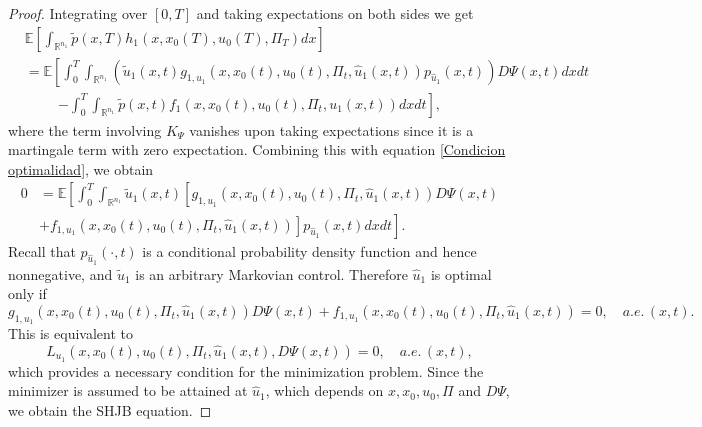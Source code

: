 \documentclass[10pt,a4paper]{amsart}
\begin{document}
\begin{proof}
Integrating over $[0,T]$ and taking expectations on both sides we get
    \begin{align*}
        & \mathbb{E}\left[\int_{\mathbb{R}^{n_1}}\tilde{p}(x,T)h_1(x,x_0(T),u_0(T),\Pi_T)dx\right] \\
        &=\mathbb{E}\left[\int_0^T\int_{\mathbb{R}^{n_1}}\left( \tilde{u}_1(x,t)g_{1,u_1}(x,x_0(t),u_0(t),\Pi_t,\hat{u}_1(x,t))p_{\hat{u}_1}(x,t) \right)D\Psi(x,t)dxdt \right.\\
        &\hspace{1cm} \left.-\int_0^T\int_{\mathbb{R}^{n_1}}\tilde{p}(x,t) f_1(x, x_0(t), u_0(t), \Pi_t, u_1(x,t)) dxdt\right],
    \end{align*}
where the term involving $K_\Psi$ vanishes upon taking expectations since it is a martingale term with zero expectation. Combining this with equation \eqref{Condicion optimalidad}, we obtain
    \begin{align*}
        0 &= \mathbb{E}\left[\int_0^T\int_{\mathbb{R}^{n_1}} \tilde{u}_1(x,t)\left[g_{1,u_1}(x,x_0(t),u_0(t),\Pi_t,\hat{u}_1(x,t))D\Psi(x,t) \right. \right. \\
        &+ \left. \left. f_{1,u_1}(x,x_0(t),u_0(t),\Pi_t,\hat{u}_1(x,t))\right] p_{\hat{u}_1}(x,t)dxdt\right].
    \end{align*}
Recall that $p_{\hat{u}_1}(\cdot,t)$ is a conditional probability density function and hence nonnegative, and $\tilde{u}_1$ is an arbitrary Markovian control. Therefore $\hat{u}_1$ is optimal only if
    $$g_{1,u_1}(x,x_0(t),u_0(t),\Pi_t,\hat{u}_1(x,t))D\Psi(x,t)+ f_{1,u_1}(x,x_0(t),u_0(t),\Pi_t,\hat{u}_1(x,t))=0,\quad a.e.\,(x,t).$$
This is equivalent to
    $$L_{u_1}(x,x_0(t),u_0(t),\Pi_t,\hat{u}_1(x,t), D\Psi(x,t))=0,\quad a.e.\,(x,t),$$
which provides a necessary condition for the minimization problem. Since the minimizer is assumed to be attained at $\hat{u}_1$, which depends on $x, x_0, u_0, \Pi$ and $D\Psi$, we obtain the SHJB equation.
\end{proof}
\end{document}
